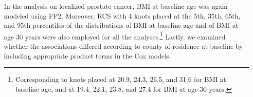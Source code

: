 In the analysis on localized prostate cancer, BMI at baseline age was again modeled using FP2. Moreover, RCS with 4 knots placed at the 5th, 35th, 65th, and 95th percentiles of the distributions of BMI at baseline age and of BMI at age 30 years were also employed for all the analyses.\footnote{Corresponding to knots placed at 20.9, 24.3, 26.5, and 31.6 \kgmsq{} for BMI at baseline age, and at 19.4, 22.1, 23.8, and 27.4 \kgmsq{} for BMI at age 30 years.} Lastly, we examined whether the associations differed according to county of residence at baseline by including appropriate product terms in the Cox models. 
